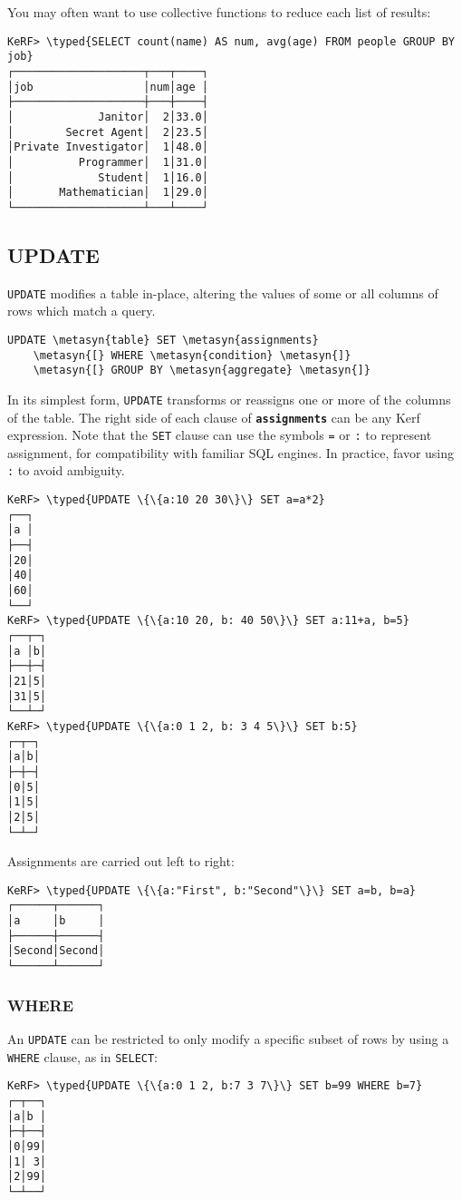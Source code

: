 \documentclass{article}
\newcommand{\typed}[1]{\textcolor{TealBlue}{#1}}
\newcommand{\metasyn}[1]{\texttt{\textbf{#1}}}
\begin{document}
You may often want to use collective functions to reduce each list of results:
\begin{Verbatim}
KeRF> \typed{SELECT count(name) AS num, avg(age) FROM people GROUP BY job}
┌────────────────────┬───┬────┐
│job                 │num│age │
├────────────────────┼───┼────┤
│             Janitor│  2│33.0│
│        Secret Agent│  2│23.5│
│Private Investigator│  1│48.0│
│          Programmer│  1│31.0│
│             Student│  1│16.0│
│       Mathematician│  1│29.0│
└────────────────────┴───┴────┘
\end{Verbatim}

\pagebreak
\subsection{UPDATE}
\texttt{UPDATE} modifies a table in-place, altering the values of some or all columns of rows which match a query.
\begin{Verbatim}
UPDATE \metasyn{table} SET \metasyn{assignments}
	\metasyn{[} WHERE \metasyn{condition} \metasyn{]}
	\metasyn{[} GROUP BY \metasyn{aggregate} \metasyn{]}
\end{Verbatim}

In its simplest form, \texttt{UPDATE} transforms or reassigns one or more of the columns of the table. The right side of each clause of \metasyn{assignments} can be any Kerf expression. Note that the \texttt{SET} clause can use the symbols \texttt{=} or \texttt{:} to represent assignment, for compatibility with familiar SQL engines. In practice, favor using \texttt{:} to avoid ambiguity.
\begin{Verbatim}
KeRF> \typed{UPDATE \{\{a:10 20 30\}\} SET a=a*2}
┌──┐
│a │
├──┤
│20│
│40│
│60│
└──┘
KeRF> \typed{UPDATE \{\{a:10 20, b: 40 50\}\} SET a:11+a, b=5}
┌──┬─┐
│a │b│
├──┼─┤
│21│5│
│31│5│
└──┴─┘
KeRF> \typed{UPDATE \{\{a:0 1 2, b: 3 4 5\}\} SET b:5}
┌─┬─┐
│a│b│
├─┼─┤
│0│5│
│1│5│
│2│5│
└─┴─┘
\end{Verbatim}

Assignments are carried out left to right:
\begin{Verbatim}
KeRF> \typed{UPDATE \{\{a:"First", b:"Second"\}\} SET a=b, b=a}
┌──────┬──────┐
│a     │b     │
├──────┼──────┤
│Second│Second│
└──────┴──────┘
\end{Verbatim}

\pagebreak
\subsubsection{WHERE}
An \texttt{UPDATE} can be restricted to only modify a specific subset of rows by using a \texttt{WHERE} clause, as in \texttt{SELECT}:
\begin{Verbatim}
KeRF> \typed{UPDATE \{\{a:0 1 2, b:7 3 7\}\} SET b=99 WHERE b=7}
┌─┬──┐
│a│b │
├─┼──┤
│0│99│
│1│ 3│
│2│99│
└─┴──┘
\end{Verbatim}
\end{document}
